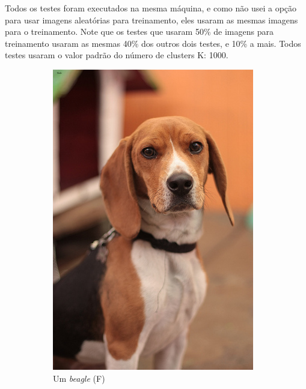 Todos os testes foram executados na mesma máquina, e como não usei a opção para usar imagens aleatórias 
para treinamento, eles usaram as mesmas imagens para o treinamento. Note que os testes
que usaram 50\% de imagens para treinamento usaram as mesmas 40\% dos outros dois testes, e 10\% a mais.
Todos testes usaram o valor padrão do número de clusters K: 1000.

\begin{figure}
  \centering
  \begin{subfigure}[b]{0.4\textwidth}
    \includegraphics[width=\textwidth]{beagle_good.jpg}
    \caption{Um \textit{beagle} (F) }
  \end{subfigure}
  ~ 
  \begin{subfigure}[b]{0.4\textwidth}

\end{subfigure}
\end{figure}
